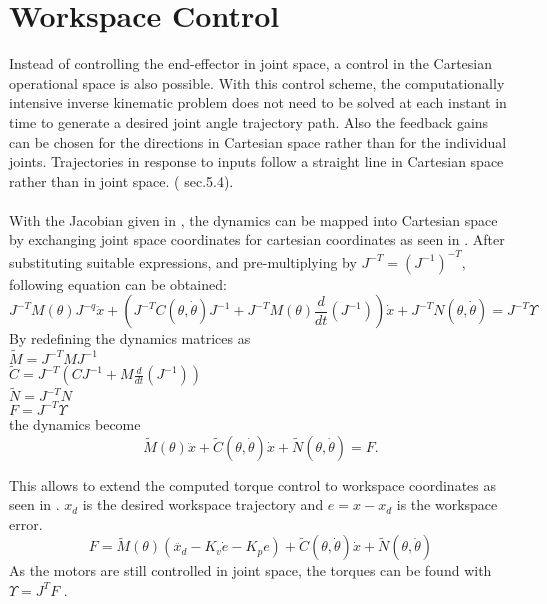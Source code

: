 \section{Workspace Control}
Instead of controlling the end-effector in joint space, a control in the Cartesian operational space is also possible. 
With this control scheme, the computationally intensive inverse kinematic problem does not need to be solved at each instant in time to generate a desired joint angle trajectory path. Also the feedback gains can be chosen for the directions in Cartesian space rather than for the individual joints. Trajectories in response to inputs follow a straight line in Cartesian space rather than in joint space. (\cite{MathIntroRobManip} sec.5.4).\\%
\\
With the Jacobian given in , the dynamics can be mapped into Cartesian space by exchanging joint space coordinates for cartesian coordinates as seen in . After substituting suitable expressions, and pre-multiplying by $ J^{-T} = (J^{-1})^{-T}$, following equation can be obtained:\\
\begin{equation} \label{eq:DyanmicsMapped}
	J^{-T} M(\theta) J^{-q} \ddot{x} + (J^{-T} C(\theta,\dot{\theta}) J^{-1} +J^{-T} M(\theta) \frac{d}{dt} (J^{-1}))\dot{x} + J^{-T} N(\theta, \dot{\theta}) = J^{-T}  \Upsilon
\end{equation}
By redefining the dynamics matrices as\\
$ \tilde{M} = J^{-T} M J^{-1}$\\
$ \tilde{C} = J^{-T} (C J^{-1} + M \frac{d}{dt} (J^{-1}))$\\
$ \tilde{N} = J^{-T} N$\\
$ F = J^{-T} \Upsilon$\\
the dynamics become\\

\begin{equation}
	\tilde{M} (\theta) \ddot{x} + \tilde{C} (\theta, \dot{\theta}) \dot{x} + \tilde{N} (\theta,\dot{\theta}) = F .
\end{equation}


This allows to extend the computed torque control to workspace coordinates as seen in . $x_d$ is the desired workspace trajectory and $ e=x-x_d$ is the workspace error. 
\begin{equation} \label{eq:workspaceContrFromCompTorqueContr}
	F=\tilde{M} (\theta) (\ddot{x_d} - K_v \dot{e} - K_p e ) + \tilde{C}(\theta,\dot{\theta})\dot{x} + \tilde{N}(\theta,\dot{\theta})
\end{equation}
As the motors are still controlled in joint space, the torques can be found with \\
$\Upsilon = J^T F$ .\\


